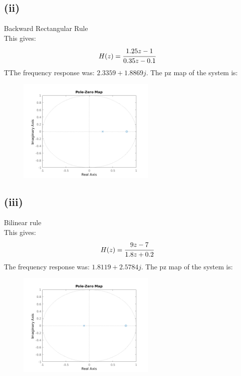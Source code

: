 \documentclass{article}
\begin{document}
\subsection*{(ii)}
Backward Rectangular Rule\\
This gives:
\[H(z)=\cfrac{1.25z-1}{0.35z-0.1}\]
TThe frequency response was: $2.3359+1.8869j$. The pz map of the system is:
\begin{figure}[H]
    \centering
    \includegraphics[width=0.6\textwidth]{PR3_2.png}
\end{figure}

\subsection*{(iii)}
Bilinear rule\\
This gives:
\[H(z)=\cfrac{9z-7}{1.8z+0.2}\]
The frequency response was: $1.8119+2.5784j$. The pz map of the system is:
\begin{figure}[H]
    \centering
    \includegraphics[width=0.6\textwidth]{PR3_3.png}
\end{figure}
\end{document}
